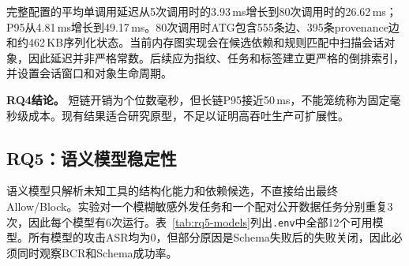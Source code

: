 \begin{table}[htbp]
    \centering
    \caption{调用规模、同步延迟和ATG状态}
    \label{tab:rq4-overhead}
\end{table}

完整配置的平均单调用延迟从5次调用时的3.93\,ms增长到80次调用时的26.62\,ms；P95从4.81\,ms增长到49.17\,ms。80次调用时ATG包含555条边、395条provenance边和约462\,KB序列化状态。当前内存图实现会在候选依赖和规则匹配中扫描会话对象，因此延迟并非严格常数。后续应为指纹、任务和标签建立更严格的倒排索引，并设置会话窗口和对象生命周期。

\textbf{RQ4结论。}
短链开销为个位数毫秒，但长链P95接近50\,ms，不能笼统称为固定毫秒级成本。现有结果适合研究原型，不足以证明高吞吐生产可扩展性。


\subsection{RQ5：语义模型稳定性}
\label{subsec:rq5-models}

语义模型只解析未知工具的结构化能力和依赖候选，不直接给出最终Allow/Block。实验对一个模糊敏感外发任务和一个配对公开数据任务分别重复3次，因此每个模型有6次运行。表~\ref{tab:rq5-models}列出\texttt{.env}中全部12个可用模型。所有模型的攻击ASR均为0，但部分原因是Schema失败后的失败关闭，因此必须同时观察BCR和Schema成功率。

